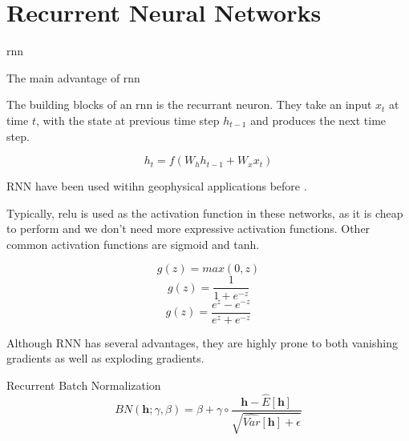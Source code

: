 \section{Recurrent Neural Networks}

\acrfull{rnn}

The main advantage of \acrshort{rnn} 

The building blocks of an \acrshort{rnn} is the recurrant neuron. They take an input $x_t$ at time $t$, with the state at previous time step $h_{t-1}$ and produces the next time step. 

\begin{equation}
    h_t = f(W_hh_{t-1}+W_xx_t)
\end{equation}

RNN have been used witihn geophysical applications before \cite{maulik2020recurrent}. 

Typically, \acrshort{relu} is used as the activation function in these networks, as it is cheap to perform and we don't need more expressive activation functions. Other common activation functions are sigmoid and tanh. 

$$g(z) = max(0, z)$$
$$g(z) = \frac{1}{1 + e^{-z}}$$
$$g(z) = \frac{e^z - e^{-z}}{e^z + e^{-z}}$$

Although RNN has several advantages, they are highly prone to both vanishing gradients as well as exploding gradients. 

Recurrent Batch Normalization
\begin{equation} \label{eq:bnrnn}
    BN(\textbf{h}; \gamma, \beta) = \beta + \gamma \circ \frac{
    \textbf{h} - \hat{E}[\textbf{h}]
    }{
    \sqrt{\hat{Var} [\textbf{h}] + \epsilon}
    }
\end{equation}
